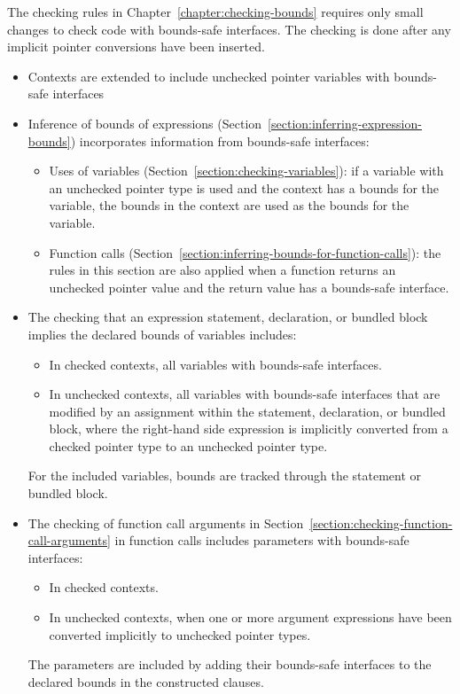 The checking rules in Chapter~\ref{chapter:checking-bounds} requires
only small changes to check code with bounds-safe interfaces.  The
checking is done after any implicit pointer conversions have been
inserted.
\begin{itemize}
\item Contexts are extended to include unchecked pointer variables with
      bounds-safe interfaces
\item Inference of bounds of expressions (Section~\ref{section:inferring-expression-bounds}) incorporates information from bounds-safe interfaces:
\begin{itemize}
\item Uses of variables (Section~\ref{section:checking-variables}): 
      if a variable with an unchecked pointer type is used and the context has
      a bounds for the variable, the bounds in the context are used as the bounds
      for the variable.
\item Function calls (Section~\ref{section:inferring-bounds-for-function-calls}): 
      the rules in this section are also applied when a function returns an unchecked
      pointer value and the return value has a bounds-safe interface.
\end{itemize}
\item The checking that an expression statement, declaration, or bundled
      block implies the declared bounds of variables includes:
\begin{itemize}
\item In checked contexts, all variables with bounds-safe interfaces.
\item In unchecked contexts, all variables with bounds-safe interfaces
      that are modified by an assignment within the statement, declaration,
      or bundled block, where the right-hand side expression
      is implicitly converted from a checked pointer type to an unchecked pointer type.
\end{itemize}
For the included variables, bounds are tracked through the statement or
bundled block.
\item The checking of function call arguments in
      Section~\ref{section:checking-function-call-arguments} 
      in function calls includes parameters with bounds-safe interfaces: 
\begin{itemize}
\item In checked contexts.
\item In unchecked contexts, when one or more argument expressions have been 
      converted implicitly to unchecked pointer types.
\end{itemize}
The parameters are included by adding their bounds-safe interfaces to the
declared bounds in the constructed  clauses.
\end{itemize}


